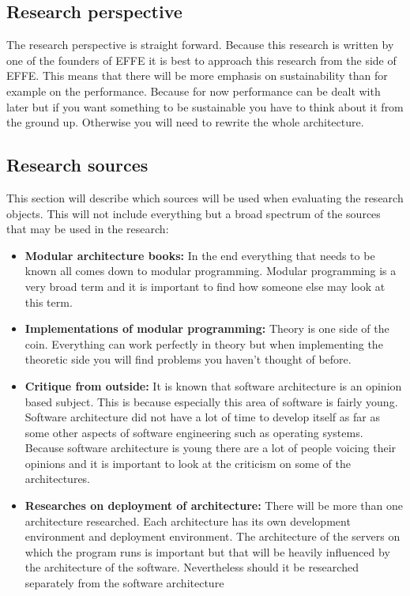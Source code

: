 \subsection{Research perspective}
The research perspective is straight forward. Because this research is written by one of the founders of EFFE it is best to approach this research from the side of EFFE. This means that there will be more emphasis on sustainability than for example on the performance. Because for now performance can be dealt with later but if you want something to be sustainable you have to think about it from the ground up. Otherwise you will need to rewrite the whole architecture.

\subsection{Research sources}
This section will describe which sources will be used when evaluating the research objects. This will not include everything but a broad spectrum of the sources that may be used in the research:

\begin{itemize}
	\item \textbf{Modular architecture books: }In the end everything that needs to be known all comes down to modular programming. Modular programming is a very broad term and it is important to find how someone else may look at this term.

	\item \textbf{Implementations of modular programming: }Theory is one side of the coin. Everything can work perfectly in theory but when implementing the theoretic side you will find problems you haven't thought of before.

	\item \textbf{Critique from outside: }It is known that software architecture is an opinion based subject. This is because especially this area of software is fairly young. Software architecture did not have a lot of time to develop itself as far as some other aspects of software engineering such as operating systems. Because software architecture is young there are a lot of people voicing their opinions and it is important to look at the criticism on some of the architectures.

	\item \textbf{Researches on deployment of architecture: } There will be more than one architecture researched. Each architecture has its own development environment and deployment environment. The architecture of the servers on which the program runs is important but that will be heavily influenced by the architecture of the software. Nevertheless should it be researched separately from the software architecture
\end{itemize}

